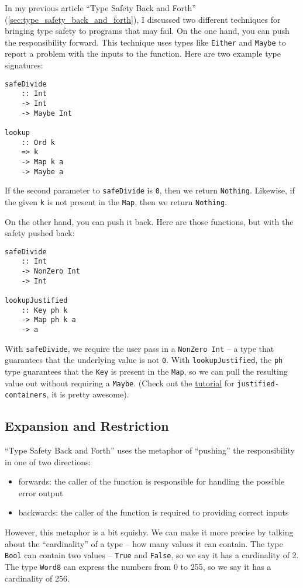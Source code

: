In my previous article ``Type Safety Back and Forth'' (\ref{sec:type_safety_back_and_forth}), I discussed two different techniques for bringing type safety to programs that may fail. On the one hand, you can push the responsibility forward. This technique uses types like \texttt{Either} and \texttt{Maybe} to report a problem with the inputs to the function. Here are two example type signatures:

\begin{verbatim}
safeDivide
    :: Int
    -> Int
    -> Maybe Int

lookup
    :: Ord k
    => k
    -> Map k a
    -> Maybe a
\end{verbatim}
If the second parameter to \texttt{safeDivide} is \texttt{0}, then we return \texttt{Nothing}. Likewise, if the given \texttt{k} is not present in the \texttt{Map}, then we return \texttt{Nothing}.

On the other hand, you can push it back. Here are those functions, but with the safety pushed back:

\begin{verbatim}
safeDivide
    :: Int
    -> NonZero Int
    -> Int

lookupJustified
    :: Key ph k
    -> Map ph k a
    -> a
\end{verbatim}
With \texttt{safeDivide}, we require the user pass in a \texttt{NonZero Int} -- a type that guarantees that the underlying value is not \texttt{0}. With \texttt{lookupJustified}, the \texttt{ph} type guarantees that the \texttt{Key} is present in the \texttt{Map}, so we can pull the resulting value out without requiring a \texttt{Maybe}. (Check out the \href{https://hackage.haskell.org/package/justified-containers-0.3.0.0/docs/Data-Map-Justified-Tutorial.html}{tutorial} for \texttt{justified-containers}, it is pretty awesome).




\subsection{Expansion and Restriction}


``Type Safety Back and Forth'' uses the metaphor of ``pushing'' the responsibility in one of two directions:

\begin{itemize}
\item forwards: the caller of the function is responsible for handling the possible error output
\item backwards: the caller of the function is required to providing correct inputs
\end{itemize}
However, this metaphor is a bit squishy. We can make it more precise by talking about the ``cardinality'' of a type -- how many values it can contain. The type \texttt{Bool} can contain two values -- \texttt{True} and \texttt{False}, so we say it has a cardinality of 2. The type \texttt{Word8} can express the numbers from 0 to 255, so we say it has a cardinality of 256.

